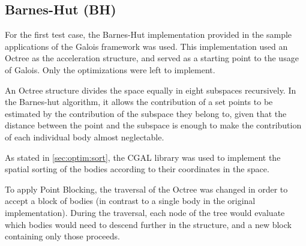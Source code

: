 \subsection{Barnes-Hut (BH)}
\label{sec:cases:barnes}

For the first test case, the Barnes-Hut implementation provided in the sample applications of the Galois framework was used.
This implementation used an Octree as the acceleration structure, and served as a starting point to the usage of Galois. Only the optimizations were left to implement.

An Octree structure divides the space equally in eight subspaces recursively. In the Barnes-hut algorithm, it allows the contribution of a set points to be estimated by the contribution of the subspace they belong to, given that the distance between the point and the subspace is enough to make the contribution of each individual body almost neglectable.

As stated in \cref{sec:optim:sort}, the CGAL library was used to implement the spatial sorting of the bodies according to their coordinates in the space.

To apply Point Blocking, the traversal of the Octree was changed in order to accept a block of bodies (in contrast to a single body in the original implementation). During the traversal, each node of the tree would evaluate which bodies would need to descend further in the structure, and a new block containing only those proceeds.
